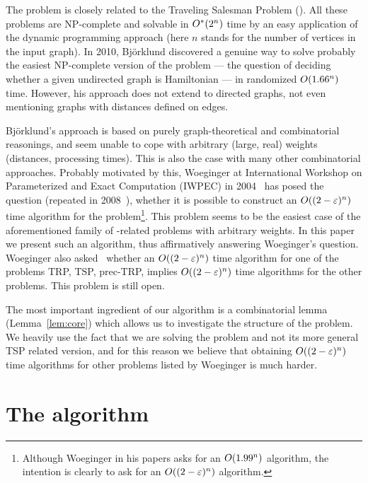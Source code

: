 \documentclass{article}
\theoremstyle{definition}
\begin{document}
The {} problem is closely related to the Traveling Salesman Problem ({}).
All these problems are NP-complete and solvable in $O^\ast(2^n)$ time by
an easy application of the dynamic programming approach (here $n$ stands for the number
of vertices in the input graph).
In 2010, Bj\"{o}rklund \cite{bjorklund-focs} discovered a genuine way to solve
probably the easiest NP-complete version of the {} problem --- the question
of deciding whether a given undirected graph is Hamiltonian --- in randomized
$O(1.66^n)$ time. However, his approach does not extend to directed graphs,
not even mentioning graphs with distances defined on edges.

Bj\"{o}rklund's approach is based on purely graph-theoretical and combinatorial reasonings,
and seem unable to cope with arbitrary (large, real) weights (distances, processing times).
This is also the case with many other combinatorial approaches.
Probably motivated by this,
Woeginger at International Workshop on Parameterized and Exact Computation
(IWPEC) in 2004~\cite{woeginger04} has posed the question (repeated in 2008~\cite{woeginger08}),
whether it is possible to construct an $O((2-\varepsilon)^n)$ time algorithm for the \schedname{} problem\footnote{Although Woeginger in his papers asks for an $O(1.99^n)$ algorithm, the intention is clearly to ask for an $O((2-\varepsilon)^n)$ algorithm.}.
This problem seems to be the easiest case of the aforementioned
family of {}-related problems with arbitrary weights.
In this paper we present such an algorithm, thus affirmatively answering Woeginger's question.
Woeginger also asked~\cite{woeginger04,woeginger08} whether an $O((2-\varepsilon)^n)$ time algorithm
for one of the problems {\sc TRP}, {\sc TSP}, prec-{\sc TRP}, \schedname{} implies $O((2-\varepsilon)^n)$
time algorithms for the other problems. This problem is still open.

The most important ingredient of our algorithm is a combinatorial lemma (Lemma~\ref{lem:core})
which allows us to investigate the structure of the \schedname{} problem.
We heavily use the fact that we are solving the \schedname{} problem and
not its more general TSP related version, and for this reason
we believe that obtaining $O((2-\varepsilon)^n)$ time algorithms for other problems
listed by Woeginger is much harder.

\section{The algorithm}
\end{document}
